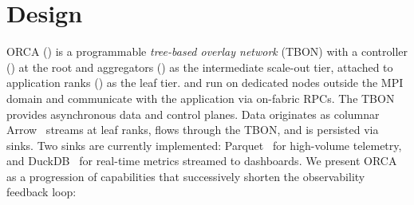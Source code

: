 
\section{Design}\label{sec:orca:design}

\figDesignArch{}

ORCA () is a programmable \emph{tree-based overlay network} (TBON) with a
controller (\tierctl{}) at the root and aggregators (\tieragg{}) as the intermediate scale-out
tier, attached to application ranks (\tiermpi{}) as the leaf tier.
\tierctl{} and \tieragg{} run on dedicated nodes outside the MPI domain and communicate with the application via
on-fabric RPCs.
The TBON provides asynchronous data and control planes.
Data originates as columnar Arrow~\cite{:ApacheArrow} streams at leaf ranks, flows through the
TBON, and is persisted via sinks.
Two sinks are currently implemented: Parquet~\cite{:ApacheParquet} for high-volume telemetry, and
DuckDB~\cite{Raasv2019:DuckDB} for real-time metrics streamed to dashboards.
We present ORCA as a progression of capabilities that successively shorten the observability feedback loop:

